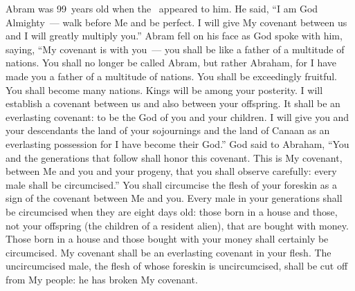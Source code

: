 
\begin{inparaenum}
   Abram was 99~years old when the \lord\ appeared to him. He said, ``I am God Almighty~--- walk before Me and be perfect.%
   I will give My covenant between us and I will greatly multiply you.''%
   Abram fell on his face as God spoke with him, saying,%
   ``My covenant is with you~--- you shall be like a father of a multitude of nations.%
   You shall no longer be called Abram, but rather Abraham, for I have made you a father of a multitude of nations.%
   You shall be exceedingly fruitful. You shall become many nations. Kings will be among your posterity.%
   I will establish a covenant between us and also between your offspring. It shall be an everlasting covenant: to be the God of you and your children.%
   I will give you and your descendants the land of your sojournings and the land of Canaan as an everlasting possession for I have become their God.''%
   God said to Abraham, ``You and the generations that follow shall honor this covenant.%
   This is My covenant, between Me and you and your progeny, that you shall observe carefully: every male shall be circumcised.''%
   You shall circumcise the flesh of your foreskin as a sign of the covenant between Me and you.%
   Every male in your generations shall be circumcised when they are eight days old: those born in a house and those, not your offspring (the children of a resident alien), that are bought with money.%
   Those born in a house and those bought with your money shall certainly be circumcised. My covenant shall be an everlasting covenant in your flesh.%
   The uncircumcised male, the flesh of whose foreskin is uncircumcised, shall be cut off from My people: he has broken My covenant.%
  

\end{inparaenum}
